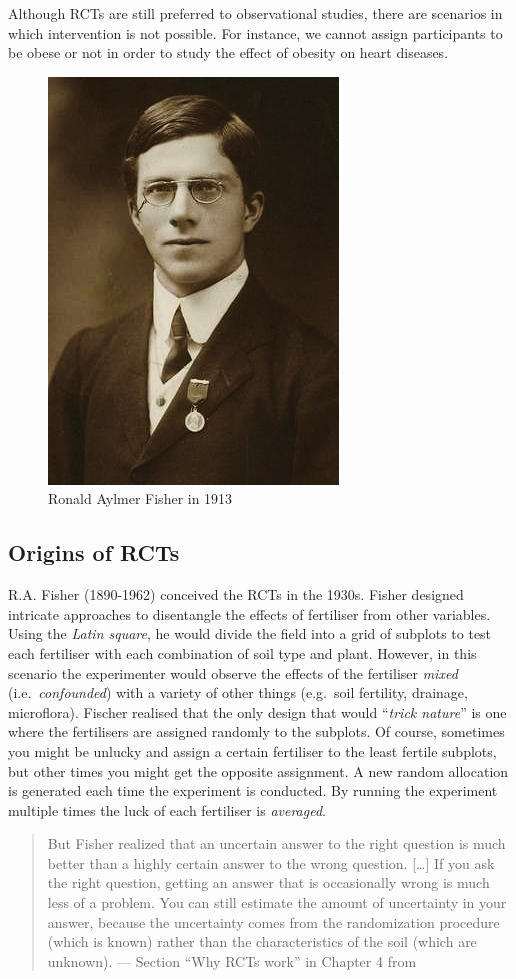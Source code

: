 \documentclass[
]{book}
\begin{document}
Although RCTs are still preferred to observational studies, there are scenarios in which intervention is not possible. For instance, we cannot assign participants to be obese or not in order to study the effect of obesity on heart diseases.

\begin{figure}  
 \begin{center}
    \includegraphics[width=.22\textwidth]{Figures/RAFisher.jpeg}  
  \captionsetup{labelformat=empty}
  \caption{Ronald Aylmer Fisher in 1913} 
\end{center}
\end{figure}
\addtocounter{figure}{-1}

\hypertarget{origins-of-rcts}{%
\subsection{Origins of RCTs}\label{origins-of-rcts}}

R.A. Fisher (1890-1962) conceived the RCTs in the 1930s. Fisher designed intricate approaches to disentangle the effects of fertiliser from other variables. Using the \emph{Latin square}, he would divide the field into a grid of subplots to test each fertiliser with each combination of soil type and plant. However, in this scenario the experimenter would observe the effects of the fertiliser \emph{mixed} (i.e.~\emph{confounded}) with a variety of other things (e.g.~soil fertility, drainage, microflora). Fischer realised that the only design that would ``\emph{trick nature}'' is one where the fertilisers are assigned randomly to the subplots. Of course, sometimes you might be unlucky and assign a certain fertiliser to the least fertile subplots, but other times you might get the opposite assignment. A new random allocation is generated each time the experiment is conducted. By running the experiment multiple times the luck of each fertiliser is \emph{averaged}.

\begin{quote}
But Fisher realized that an uncertain answer to the right question is much better than a highly certain answer to the wrong question. {[}\ldots{]} If you ask the right question, getting an answer that is occasionally wrong is much less of a problem. You can still estimate the amount of uncertainty in your answer, because the uncertainty comes from the randomization procedure (which is known) rather than the characteristics of the soil (which are unknown). --- Section ``Why RCTs work'' in Chapter 4 from \citep{book-of-why}
\end{quote}
\end{document}
